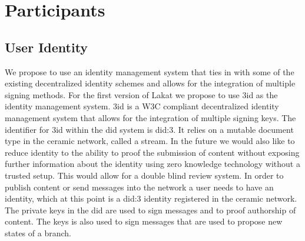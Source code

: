 
\section{Participants}
\label{sc:participantsandnodes}

\subsection{User Identity}
\label{ssc:accounts}

We propose to use an identity management system that ties in with some of the existing decentralized identity schemes and allows for the integration of multiple signing methods. For the first version of Lakat we propose to use 3id as the identity management system. 3id is a W3C compliant decentralized identity management system that allows for the integration of multiple signing keys. The identifier for 3id within the did system is did:3. It relies on a mutable document type in the ceramic network, called a stream. In the future we would also like to reduce identity to the ability to proof the submission of content without exposing further information about the identity using zero knowledge technology without a trusted setup. This would allow for a double blind review system. In order to publish content or send messages into the network a user needs to have an identity, which at this point is a did:3 identity registered in the ceramic network. The private keys in the did are used to sign messages and to proof authorship of content. The keys is also used to sign messages that are used to propose new states of a branch.


